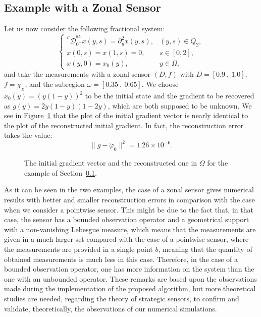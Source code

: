 \documentclass{article}
\begin{document}

\subsection{Example with a Zonal Sensor}
\label{sec:ex2}

Let us now consider the following fractional system:
\begin{equation}
\label{sys.exp.2}
\left\{
\begin{array}{llll}
^{^C}\mathcal{D}_{0^+}^{^{0.5}}x(y,s) 
= \partial_y^2x(y,s),  & (y,s)\in Q_2, \\ 
x(0,s)=x(1,s) = 0,  & s\in[0,2], \\
x(y,0) = x_0(y), & y\in\Omega,
\end{array}\right.
\end{equation}
and take the measurements with a zonal sensor $(D,f)$ 
with $D = [0.9\ ,\ 1.0]$, $f=\chi_{_{D}}$, and the subregion 
$\omega = [0.35\ ,\ 0.65]$. We choose $x_0(y) = (y(1-y))^2$ 
to be the initial state and the gradient to be recovered as
$g(y) = 2y(1-y)(1-2y)$, which are both supposed to be unknown. 
We see in Figure~\ref{zone} that the plot of the initial gradient 
vector is nearly identical to the plot of the reconstructed initial 
gradient. In fact, the reconstruction error takes the value:
$$
\|g - \tilde{\varphi}_0 \|^2 = 1.26\times10^{-6}.
$$
\begin{figure}
\caption{\label{zone} The initial gradient vector 
and the reconstructed one in $\Omega$  
for the example of Section~\ref{sec:ex2}.}
\end{figure}
As it can be seen in the two examples, 
the case of a zonal sensor gives numerical results with 
better and smaller reconstruction errors in comparison 
with the case when we consider a pointwise sensor. This might be due to
the fact that, in that case, the sensor has a bounded observation 
operator and a geometrical support with a non-vanishing Lebesgue measure, 
which means that the measurements are given in a much larger set compared 
with the case of a pointwise sensor, where the measurements are provided 
in a single point $b$, meaning that the quantity of 
obtained measurements is much less in this case. Therefore, 
in the case of a bounded observation operator, one has more information 
on the system than the one with an unbounded operator. 
These remarks are based upon the observations 
made during the implementation of the proposed algorithm, 
but more theoretical studies are needed, regarding the theory 
of strategic sensors, to confirm and validate, theoretically,
the observations of our numerical simulations.
\end{document}
